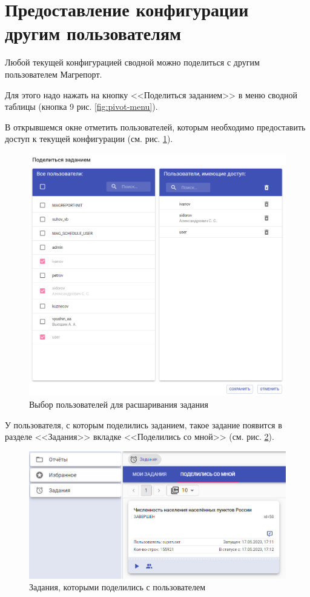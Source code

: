 \documentclass[../user-manual.tex]{subfiles}
\begin{document}
	
	\section{Предоставление конфигурации другим пользователям}
		
	Любой текущей конфигурацией сводной можно поделиться с другим пользователем Магрепорт.
	
	Для этого надо нажать на кнопку <<Поделиться заданием>> в меню сводной таблицы (кнопка 9 рис. \ref{fig:pivot-menu}).
	
	В открывшемся окне отметить пользователей, которым необходимо предоставить доступ к текущей конфигурации (см. рис. \ref{fig:share-pivot}).
	
	\begin{figure}[h]
		\centering
		\includegraphics[width=\graphicswidth]{img/28-share-pivot.png}
		\caption{Выбор пользователей для расшаривания задания}
		\label{fig:share-pivot}
	\end{figure}	

	У пользователя, с которым поделились заданием, такое задание появится в разделе <<Задания>> вкладке <<Поделились со мной>> (см. рис. \ref{fig:shared-task}).
	
	\begin{figure}[h]
		\centering
		\includegraphics[width=\graphicswidth]{img/29-shared-task.png}
		\caption{Задания, которыми поделились с пользователем}
		\label{fig:shared-task}
	\end{figure}	
	
\end{document}
